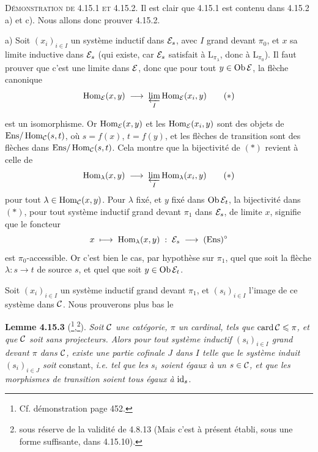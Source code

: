\textsc{Démonstration de 4.15.1 et 4.15.2.} Il est clair que 4.15.1 est contenu dans 4.15.2 a) et c). Nous allons donc prouver 4.15.2.

a) Soit $(x_i)_{i\in I}$ un système inductif dans $\mathcal{E}_s$, avec $I$ grand devant $\pi_0$, et $x$ sa limite inductive dans $\mathcal{E}_s$ (qui existe, car $\mathcal{E}_s$ satisfait à $\mathrm{L}_{\pi_\lambda}$, donc à $\mathrm{L}_{\pi_0}$). Il faut prouver que c'est une limite dans $\mathcal{E}$, donc que pour tout $y \in \operatorname{Ob}\mathcal{E}$, la flèche canonique
\[
\Hom_{\cE}(x,y) \;\longrightarrow\; \varprojlim_{I} \Hom_{\cE}(x_i,y) \tag*{$(*)$}
\]

est un isomorphisme. Or $\operatorname{Hom}_{\mathcal{E}}(x,y)$ et les $\operatorname{Hom}_{\mathcal{E}}(x_i,y)$ sont des objets de $\mathrm{Ens}/\operatorname{Hom}_{\mathcal{C}}(s,t)$, où $s = f(x)$, $t = f(y)$, et les flèches de transition sont des flèches dans $\mathrm{Ens}/\operatorname{Hom}_{\mathcal{C}}(s,t)$. Cela montre que la bijectivité de $(*)$ revient à celle de
\[
\Hom_\lambda(x,y) \;\longrightarrow\; \varprojlim_{I} \Hom_\lambda(x_i,y) \tag*{$(*)$}
\]
pour tout $\lambda \in \operatorname{Hom}_{\mathcal{C}}(x,y)$. Pour $\lambda$ fixé, et $y$ fixé dans $\operatorname{Ob}\mathcal{E}_t$, la bijectivité dans $(*)$, pour tout système inductif grand devant $\pi_1$ dans $\mathcal{E}_s$, de limite $x$, signifie que le foncteur
\[
x \;\longmapsto\; \operatorname{Hom}_\lambda(x,y) \;:\; \mathcal{E}_s \;\longrightarrow\; (\mathrm{Ens})^\circ
\]
est $\pi_0$-accessible. Or c'est bien le cas, par hypothèse sur $\pi_1$, quel que soit la flèche $\lambda : s \longrightarrow t$ de source $s$, et quel que soit $y \in \operatorname{Ob}\mathcal{E}_t$.

Soit $(x_i)_{i\in I}$ un système inductif grand devant $\pi_1$, et $(s_i)_{i\in I}$ l'image de ce système dans $\mathcal{C}$. Nous prouverons plus bas le

\textbf{Lemme 4.15.3} (\footnote{Cf. démonstration page 452.},\footnote{sous réserve de la validité de 4.8.13 (Mais c'est à présent établi, sous une forme suffisante, dans 4.15.10).}). \textit{Soit $\mathcal{C}$ une catégorie, $\pi$ un cardinal, tels que} $\operatorname{card}\mathcal{C} \leqslant \pi$\textit{, et que $\mathcal{C}$ soit sans projecteurs. Alors pour tout système inductif $(s_i)_{i\in I}$ grand devant $\pi$ dans $\mathcal{C}$, existe une partie cofinale $J$ dans $I$ telle que le système induit $(s_i)_{i\in J}$ soit} constant, \textit{i.e. tel que les $s_i$ soient égaux à un $s \in \mathcal{C}$, et que les morphismes de transition soient tous égaux à} $\mathrm{id}_s$.

